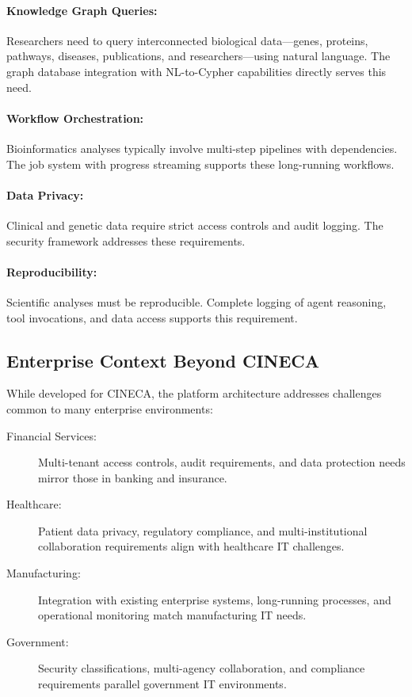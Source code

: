 \documentclass[a4paper,twoside]{sapthesis}
\begin{document}
\paragraph{Knowledge Graph Queries:}
Researchers need to query interconnected biological data---genes, proteins, pathways, diseases, publications, and researchers---using natural language. The graph database integration with NL-to-Cypher capabilities directly serves this need.

\paragraph{Workflow Orchestration:}
Bioinformatics analyses typically involve multi-step pipelines with dependencies. The job system with progress streaming supports these long-running workflows.

\paragraph{Data Privacy:}
Clinical and genetic data require strict access controls and audit logging. The security framework addresses these requirements.

\paragraph{Reproducibility:}
Scientific analyses must be reproducible. Complete logging of agent reasoning, tool invocations, and data access supports this requirement.

\subsection{Enterprise Context Beyond CINECA}

While developed for CINECA, the platform architecture addresses challenges common to many enterprise environments:

\begin{description}
    \item[Financial Services:] Multi-tenant access controls, audit requirements, and data protection needs mirror those in banking and insurance.
    
    \item[Healthcare:] Patient data privacy, regulatory compliance, and multi-institutional collaboration requirements align with healthcare IT challenges.
    
    \item[Manufacturing:] Integration with existing enterprise systems, long-running processes, and operational monitoring match manufacturing IT needs.
    
    \item[Government:] Security classifications, multi-agency collaboration, and compliance requirements parallel government IT environments.
\end{description}
\end{document}
